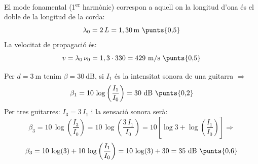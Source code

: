 \begin{solapartat}
El mode fonamental (1\textsuperscript{er} harmònic) correspon a aquell on la longitud d'ona és el doble de la longitud de la corda:
\[ \lambda_0 = 2\,L = 1,30\,\mathrm{m}\ \text{\punts{0,5}} \]
La velocitat de propagació és:
\[ v = \lambda_0\,\nu_0 = 1,3\cdot 330 = 429\ \mathrm{m/s}\ \text{\punts{0,5}} \]
\end{solapartat}

\begin{solapartat}
Per $d = 3\ \mathrm{m}$ tenim $\beta = 30\ \mathrm{dB}$, si $I_1$ és la intensitat sonora de una guitarra $\Rightarrow$
\[ \beta_1 = 10\,\log\left(\frac{I_1}{I_0}\right) = 30\ \mathrm{dB}\ \text{\punts{0,2}} \]
Per tres guitarres: $I_3 = 3\,I_1$  i la sensació sonora serà:
\[ \beta_3 = 10\,\log\left(\frac{I_3}{I_0}\right) = 10\,\log\left(\frac{3\,I_1}{I_0}\right) = 10\left[\log 3 + \log\left(\frac{I_1}{I_0}\right)\right] \Rightarrow \]
\[ \beta_3 = 10\,\log(3) + 10\,\log\left(\frac{I_1}{I_0}\right) = 10\,\log(3) + 30 = 35\ \mathrm{dB}\ \text{\punts{0,6}} \]
\end{solapartat}
